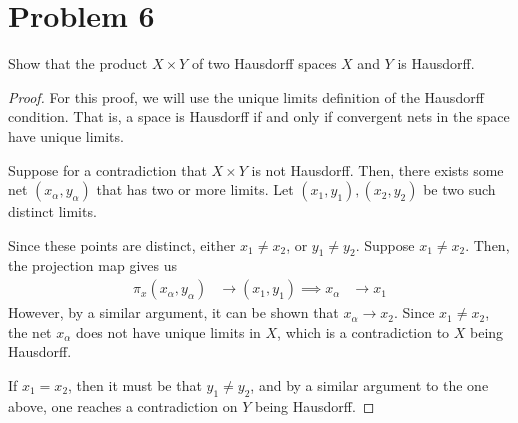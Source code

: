 \documentclass[fontsize=11pt]{scrartcl} %
\numberwithin{equation}{section} %
\numberwithin{figure}{section} %
\numberwithin{table}{section} %
\begin{document}
\section*{Problem 6}
Show that the product $X\times Y$ of two Hausdorff spaces $X$ and $Y$ is Hausdorff.
\\
\begin{proof}
For this proof, we will use the unique limits definition of the Hausdorff condition.
That is, a space is Hausdorff if and only if convergent nets in the space have unique limits.

Suppose for a contradiction that $X\times Y$ is not Hausdorff. Then, there exists some
net $(x_{\alpha},y_{\alpha})$ that has two or more limits. Let $(x_1,y_1),(x_2,y_2)$ be two
such distinct limits.

Since these points are distinct, either $x_1\neq x_2$, or $y_1\neq y_2$. Suppose $x_1\neq x_2$.
Then, the projection map gives us
\[
\begin{aligned}
\pi_x(x_{\alpha},y_{\alpha})&\to(x_1,y_1)
\implies x_{\alpha}&\to x_1
\end{aligned}
\]
However, by a similar argument, it can be shown that $x_{\alpha}\to x_2$. Since $x_1 \neq x_2$,
the net $x_{\alpha}$ does not have unique limits in $X$, which is a contradiction to $X$ being Hausdorff.

If $x_1 = x_2$, then it must be that $y_1\neq y_2$, and by a similar argument to the one above,
one reaches a contradiction on $Y$ being Hausdorff.
\end{proof}

\end{document}

